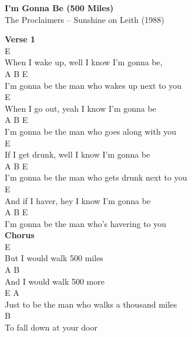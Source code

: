 \documentclass[a4paper]{article}
\begin{document}
    \begin{center}
        \textbf{I'm Gonna Be (500 Miles)}
        ~\\
        The Proclaimers -- Sunshine on Leith (1988)
    \end{center}
    {
        \scriptsize
        \textbf{Verse 1}
        ~\\
        {
            \cutive
            \obeyspaces
       E
\\
When I wake up, well I know I'm gonna be,
\\
          A              B                E
\\
I'm gonna be the man who wakes up next to you
\\
E
\\
When I go out, yeah I know I'm gonna be
\\
          A              B               E
\\
I'm gonna be the man who goes along with you
\\
E
\\
If I get drunk, well I know I'm gonna be
\\
          A              B                  E
\\
I'm gonna be the man who gets drunk next to you
\\
E
\\
And if I haver, hey I know I'm gonna be
\\
          A                B           E
\\
I'm gonna be the man who's havering to you
\\

        }
        \textbf{Chorus}
        ~\\
        {
            \cutive
            \obeyspaces
E
\\
But I would walk 500 miles
\\
    A            B
\\
And I would walk 500 more
\\
        E                               A
\\
Just to be the man who walks a thousand miles
\\
             B       
\\
To fall down at your door
\\

}}
\end{document}
